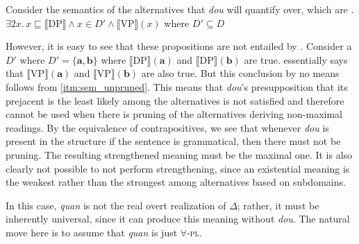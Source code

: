 \documentclass[12pt]{article}
\newcommand{\Exh}{\ensuremath{\mathcal{E}\mathit{xh}}}
\begin{document}
Consider the semantics of the alternatives that \emph{dou} will quantify over, which are
\ex. \(\exists 2 x.\, x \sqsubseteq \llbracket \text{DP} \rrbracket \land x \in D' \land \llbracket \text{VP} \rrbracket(x)\) where \(D' \subseteq D\)

However, it is easy to see that these propositions are not entailed by \LLast.
Consider a \(D'\) where \(D' = \{ \mathbf{a}, \mathbf{b} \}\) where \(\llbracket \text{DP} \rrbracket(\mathbf{a})\) and \(\llbracket \text{DP} \rrbracket(\mathbf{b})\) are true.
\Last essentially says that \(\llbracket \text{VP} \rrbracket(\mathbf{a})\) and \(\llbracket \text{VP} \rrbracket(\mathbf{b})\) are also true.
But this conclusion by no means follows from \cref{itm:sem_unpruned}.
This means that \emph{dou}'s presupposition that its prejacent is the least likely among the alternatives is not satisfied and therefore cannot be used when there is pruning of the alternatives deriving non-maximal readings.
By the equivalence of contrapositives, we see that whenever \emph{dou} is present in the structure if the sentence is grammatical, then there must not be pruning.
The resulting strengthened meaning must be the maximal one.
It is also clearly not possible to not perform strengthening, since an existential meaning is the weakest rather than the strongest among alternatives based on subdomains.

In this case, \emph{quan} is not the real overt realization of \(\Delta\); rather, it must be inherently universal, since it can produce this meaning without \emph{dou}.
The natural move here is to assume that \emph{quan} is just \(\forall\)-\textsc{pl}.
\end{document}
